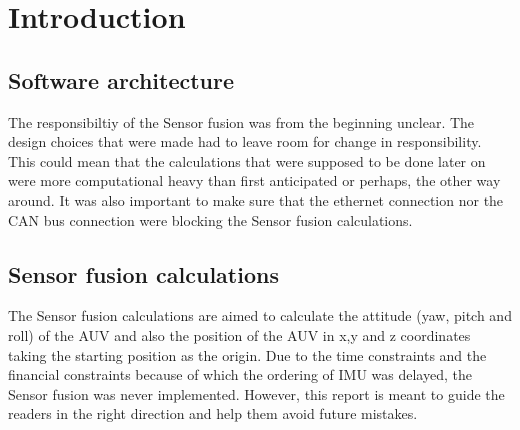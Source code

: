 \section{Introduction}\label{sec:introduction}
\subsection{Software architecture}
The responsibiltiy of the Sensor fusion was from the beginning unclear. The design
choices that were made had to leave room for change in responsibility.
This could mean that the calculations that were supposed to be done later on were
more computational heavy than first anticipated or perhaps, the other way around.
It was also important to make sure that the ethernet connection nor the CAN bus
connection were blocking the Sensor fusion calculations.

\subsection{Sensor fusion calculations}
The Sensor fusion calculations are aimed to calculate the attitude
(yaw, pitch and roll) of the AUV and also the position of the AUV in x,y and z
coordinates taking the starting position as the origin. Due to the time
constraints and the financial constraints because of which the ordering of IMU
was delayed, the Sensor fusion was never implemented. However, this report
is meant to guide the readers in the right direction and help them avoid
future mistakes.

